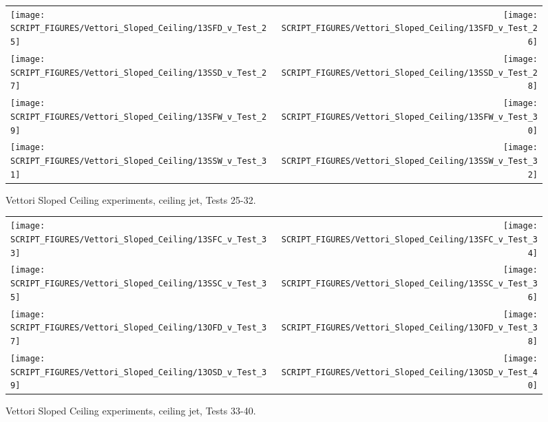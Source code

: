 \begin{figure}[p]
\begin{tabular*}{\textwidth}{l@{\extracolsep{\fill}}r}
\texttt{[image: SCRIPT\_FIGURES/Vettori\_Sloped\_Ceiling/13SFD\_v\_Test\_25]} &
\texttt{[image: SCRIPT\_FIGURES/Vettori\_Sloped\_Ceiling/13SFD\_v\_Test\_26]} \\
\texttt{[image: SCRIPT\_FIGURES/Vettori\_Sloped\_Ceiling/13SSD\_v\_Test\_27]} &
\texttt{[image: SCRIPT\_FIGURES/Vettori\_Sloped\_Ceiling/13SSD\_v\_Test\_28]} \\
\texttt{[image: SCRIPT\_FIGURES/Vettori\_Sloped\_Ceiling/13SFW\_v\_Test\_29]} &
\texttt{[image: SCRIPT\_FIGURES/Vettori\_Sloped\_Ceiling/13SFW\_v\_Test\_30]} \\
\texttt{[image: SCRIPT\_FIGURES/Vettori\_Sloped\_Ceiling/13SSW\_v\_Test\_31]} &
\texttt{[image: SCRIPT\_FIGURES/Vettori\_Sloped\_Ceiling/13SSW\_v\_Test\_32]} \\
\end{tabular*}
\caption{Vettori Sloped Ceiling experiments, ceiling jet, Tests 25-32.}
\label{Vettori_Sloped_4}
\end{figure}

\begin{figure}[p]
\begin{tabular*}{\textwidth}{l@{\extracolsep{\fill}}r}
\texttt{[image: SCRIPT\_FIGURES/Vettori\_Sloped\_Ceiling/13SFC\_v\_Test\_33]} &
\texttt{[image: SCRIPT\_FIGURES/Vettori\_Sloped\_Ceiling/13SFC\_v\_Test\_34]} \\
\texttt{[image: SCRIPT\_FIGURES/Vettori\_Sloped\_Ceiling/13SSC\_v\_Test\_35]} &
\texttt{[image: SCRIPT\_FIGURES/Vettori\_Sloped\_Ceiling/13SSC\_v\_Test\_36]} \\
\texttt{[image: SCRIPT\_FIGURES/Vettori\_Sloped\_Ceiling/13OFD\_v\_Test\_37]} &
\texttt{[image: SCRIPT\_FIGURES/Vettori\_Sloped\_Ceiling/13OFD\_v\_Test\_38]} \\
\texttt{[image: SCRIPT\_FIGURES/Vettori\_Sloped\_Ceiling/13OSD\_v\_Test\_39]} &
\texttt{[image: SCRIPT\_FIGURES/Vettori\_Sloped\_Ceiling/13OSD\_v\_Test\_40]} \\
\end{tabular*}
\caption{Vettori Sloped Ceiling experiments, ceiling jet, Tests 33-40.}
\label{Vettori_Sloped_5}
\end{figure}

